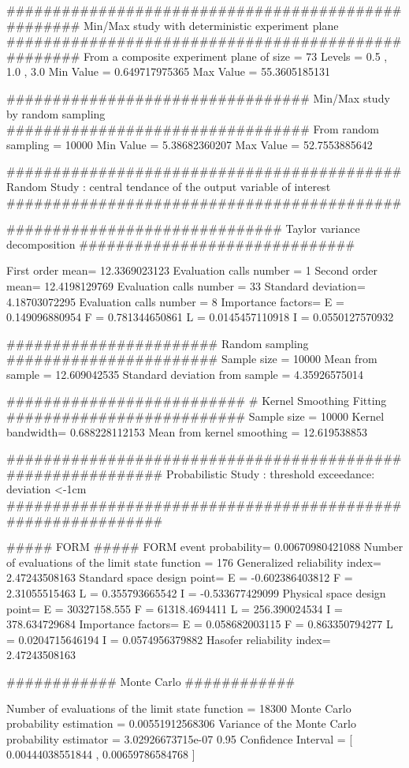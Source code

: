 ###################################################
Min/Max study with deterministic experiment plane
###################################################
From a composite  experiment plane of size =  73
Levels =  0.5 ,  1.0 ,  3.0
Min Value =  0.649717975365
Max Value =  55.3605185131

#################################
Min/Max study by random sampling
#################################
From random sampling =  10000
Min Value =  5.38682360207
Max Value =  52.7553885642


###########################################
Random Study : central tendance of
the output variable of interest
###########################################

##############################
Taylor variance decomposition
##############################

First order mean= 12.3369023123
Evaluation calls number =  1
Second order mean= 12.4198129769
Evaluation calls number =  33
Standard deviation= 4.18703072295
Evaluation calls number =  8
Importance factors=
E  =  0.149096880954
F  =  0.781344650861
L  =  0.0145457110918
I  =  0.0550127570932

#######################
Random sampling
#######################
Sample size =  10000
Mean from sample =  12.609042535
Standard deviation from sample =  4.35926575014

##########################
# Kernel Smoothing Fitting
##########################
Sample size =  10000
Kernel bandwidth= 0.688228112153
Mean from kernel smoothing =  12.619538853


############################################################
Probabilistic Study : threshold exceedance: deviation <-1cm
############################################################

#####
FORM
#####
FORM event probability= 0.00670980421088
Number of evaluations of the limit state function =  176
Generalized reliability index= 2.47243508163
Standard space design point=
E  =  -0.602386403812
F  =  2.31055515463
L  =  0.355793665542
I  =  -0.533677429099
Physical space design point=
E  =  30327158.555
F  =  61318.4694411
L  =  256.390024534
I  =  378.634729684
Importance factors=
E  =  0.058682003115
F  =  0.863350794277
L  =  0.0204715646194
I  =  0.0574956379882
Hasofer reliability index= 2.47243508163

############
Monte Carlo
############

Number of evaluations of the limit state function =  18300
Monte Carlo probability estimation =  0.00551912568306
Variance of the Monte Carlo probability estimator =  3.02926673715e-07
0.95 Confidence Interval = [ 0.00444038551844 ,  0.00659786584768 ]

